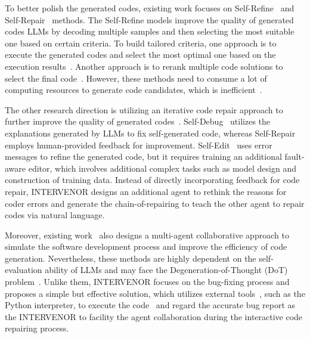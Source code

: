 \documentclass[11pt]{article}
\begin{document}
To better polish the generated codes, existing work focuses on Self-Refine~\cite{Olausson2023IsSA} and Self-Repair~\cite{chen2023teaching} methods. The Self-Refine models improve the quality of generated codes LLMs by decoding multiple samples and then selecting the most suitable one based on certain criteria. To build tailored criteria, one approach is to execute the generated codes and select the most optimal one based on the execution results~\cite{ni2023lever,zhang2022coder,shi2022natural,Li_2022}. Another approach is to rerank multiple code solutions to select the final code~\cite{shi2022natural,zhang2022coder,chen2022codet,inala2022faultaware}. However, these methods need to consume a lot of computing resources to generate code candidates, which is inefficient~\cite{zhang2023selfedit}.

The other research direction is utilizing an iterative code repair approach to further improve the quality of generated codes~\cite{zhang2023selfedit,welleck2022generating,madaan2023selfrefine,shinn2023reflexion}. Self-Debug~\cite{chen2023teaching} utilizes the explanations generated by LLMs to fix self-generated code, whereas Self-Repair~\cite{Olausson2023IsSA} employs human-provided feedback for improvement. Self-Edit~\cite{zhang2023selfedit} uses error messages to refine the generated code, but it requires training an additional fault-aware editor, which involves additional complex tasks such as model design and construction of training data. Instead of directly incorporating feedback for code repair, INTERVENOR designs an additional agent to rethink the reasons for coder errors and generate the chain-of-repairing to teach the other agent to repair codes via natural language. 

Moreover, existing work~\cite{dong2023selfcollaboration,qian2023communicative} also designs a multi-agent collaborative approach to simulate the software development process and improve the efficiency of code generation. Nevertheless, these methods are highly dependent on the self-evaluation ability of LLMs and may face the Degeneration-of-Thought (DoT) problem~\cite{liang2023encouraging,shinn2023reflexion}. 
Unlike them, INTERVENOR focuses on the bug-fixing process and proposes a simple but effective solution, which utilizes external tools~\cite{qian2023creator}, such as the Python interpreter, to execute the code~\cite{xu2023lemur,qian2023creator} and regard the accurate bug report as the INTERVENOR to facility the agent collaboration during the interactive code repairing process.
\end{document}
